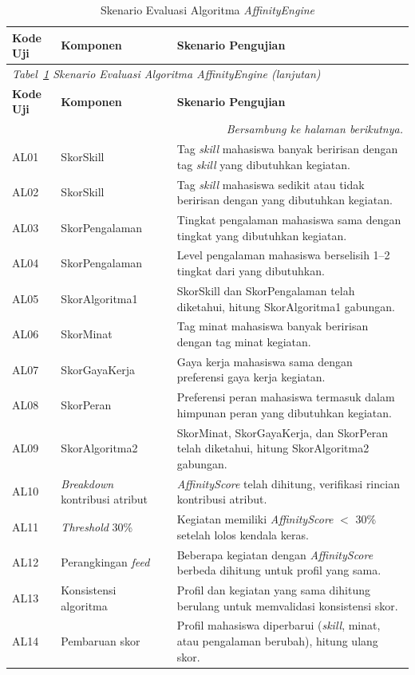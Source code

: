 \begin{longtable}{p{1.5cm} p{4.5cm} >{\raggedright\arraybackslash}p{\dimexpr\linewidth-6cm-6\tabcolsep\relax}}
  \caption{Skenario Evaluasi Algoritma \emph{AffinityEngine}}
  \label{tab:skenario-algoritma} \\
  \toprule
    \textbf{Kode Uji} & \textbf{Komponen} & \textbf{Skenario Pengujian} \\
  \midrule
  \endfirsthead
  \multicolumn{3}{l}{\small\textit{Tabel~\ref{tab:skenario-algoritma} Skenario Evaluasi Algoritma \emph{AffinityEngine} (lanjutan)}} \\
  \toprule
    \textbf{Kode Uji} & \textbf{Komponen} & \textbf{Skenario Pengujian} \\
  \midrule
  \endhead
  \bottomrule
  \multicolumn{3}{r}{\textit{Bersambung ke halaman berikutnya.}} \\
  \endfoot
  \bottomrule
  \endlastfoot
  AL01 & SkorSkill & Tag \emph{skill} mahasiswa banyak beririsan dengan tag \emph{skill} yang dibutuhkan kegiatan. \\
  \midrule
  AL02 & SkorSkill & Tag \emph{skill} mahasiswa sedikit atau tidak beririsan dengan yang dibutuhkan kegiatan. \\
  \midrule
  AL03 & SkorPengalaman & Tingkat pengalaman mahasiswa sama dengan tingkat yang dibutuhkan kegiatan. \\
  \midrule
  AL04 & SkorPengalaman & Level pengalaman mahasiswa berselisih 1--2 tingkat dari yang dibutuhkan. \\
  \midrule
  AL05 & SkorAlgoritma1 & SkorSkill dan SkorPengalaman telah diketahui, hitung SkorAlgoritma1 gabungan. \\
  \midrule
  AL06 & SkorMinat & Tag minat mahasiswa banyak beririsan dengan tag minat kegiatan. \\
  \midrule
  AL07 & SkorGayaKerja & Gaya kerja mahasiswa sama dengan preferensi gaya kerja kegiatan. \\
  \midrule
  AL08 & SkorPeran & Preferensi peran mahasiswa termasuk dalam himpunan peran yang dibutuhkan kegiatan. \\
  \midrule
  AL09 & SkorAlgoritma2 & SkorMinat, SkorGayaKerja, dan SkorPeran telah diketahui, hitung SkorAlgoritma2 gabungan. \\
  \midrule
  AL10 & \emph{Breakdown} kontribusi atribut & \emph{AffinityScore} telah dihitung, verifikasi rincian kontribusi atribut. \\
  \midrule
  AL11 & \emph{Threshold} 30\% & Kegiatan memiliki \emph{AffinityScore} $<$ 30\% setelah lolos kendala keras. \\
  \midrule
  AL12 & Perangkingan \emph{feed} & Beberapa kegiatan dengan \emph{AffinityScore} berbeda dihitung untuk profil yang sama. \\
  \midrule
  AL13 & Konsistensi algoritma & Profil dan kegiatan yang sama dihitung berulang untuk memvalidasi konsistensi skor. \\
  \midrule
  AL14 & Pembaruan skor & Profil mahasiswa diperbarui (\emph{skill}, minat, atau pengalaman berubah), hitung ulang skor. \\
\end{longtable}

